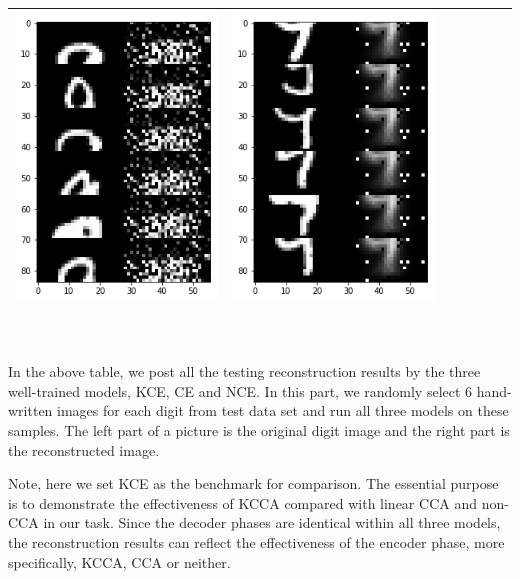 \documentclass[12pt]{report} %
\begin{document}
\begin{tabular}{m{0.7cm}m{2.4cm}m{2.4cm}m{2.4cm}m{2.4cm}m{2.4cm}m{2.4cm}}
	\includegraphics[scale=0.3]{pictures/M2_9_up.png} & \includegraphics[scale=0.3]{pictures/M2_9_down.png}\\
	\bottomrule
\end{tabular}
\\
\\
In the above table, we post all the testing reconstruction results by the three well-trained models, KCE, CE and NCE. In this part, we randomly select 6 hand-written images for each digit from test data set and run all three models on these samples. The left part of a picture is the original digit image and the right part is the reconstructed image. 

Note, here we set KCE as the benchmark for comparison. The essential purpose is to demonstrate the effectiveness of KCCA compared with linear CCA and non-CCA in our task. Since the decoder phases are identical within all three models, the reconstruction results can reflect the effectiveness of the encoder phase, more specifically, KCCA, CCA or neither. 
\end{document}
